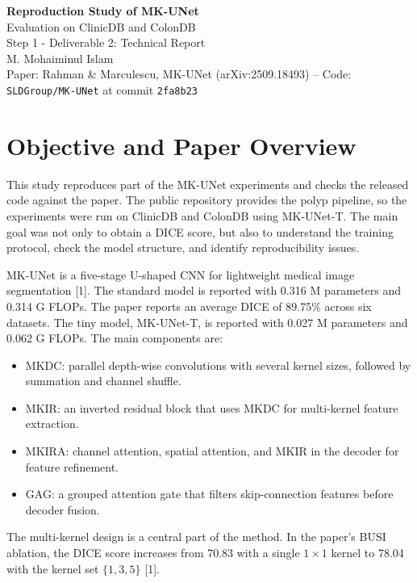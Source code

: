 \documentclass[10pt,a4paper]{article}
\begin{document}
\begin{center}
{\LARGE\bfseries Reproduction Study of MK-UNet}\\[3pt]
{\large Evaluation on ClinicDB and ColonDB}\\[4pt]
{\small Step 1 - Deliverable 2: Technical Report}\\[3pt]
{\normalsize M. Mohaiminul Islam}\\[3pt]
{\footnotesize Paper: Rahman \& Marculescu, MK-UNet (arXiv:2509.18493) \quad--\quad
Code: \texttt{SLDGroup/MK-UNet} at commit \texttt{2fa8b23}}
\end{center}
\vspace{0.25em}

\section{Objective and Paper Overview}

This study reproduces part of the MK-UNet experiments and checks the released code against the paper. The public repository provides the polyp pipeline, so the experiments were run on ClinicDB and ColonDB using MK-UNet-T. The main goal was not only to obtain a DICE score, but also to understand the training protocol, check the model structure, and identify reproducibility issues.

MK-UNet is a five-stage U-shaped CNN for lightweight medical image segmentation [1]. The standard model is reported with 0.316 M parameters and 0.314 G FLOPs. The paper reports an average DICE of 89.75\% across six datasets. The tiny model, MK-UNet-T, is reported with 0.027 M parameters and 0.062 G FLOPs. The main components are:

\begin{itemize}
\item MKDC: parallel depth-wise convolutions with several kernel sizes, followed by summation and channel shuffle.
\item MKIR: an inverted residual block that uses MKDC for multi-kernel feature extraction.
\item MKIRA: channel attention, spatial attention, and MKIR in the decoder for feature refinement.
\item GAG: a grouped attention gate that filters skip-connection features before decoder fusion.
\end{itemize}

The multi-kernel design is a central part of the method. In the paper's BUSI ablation, the DICE score increases from 70.83 with a single $1\times1$ kernel to 78.04 with the kernel set $\{1,3,5\}$ [1].
\end{document}
